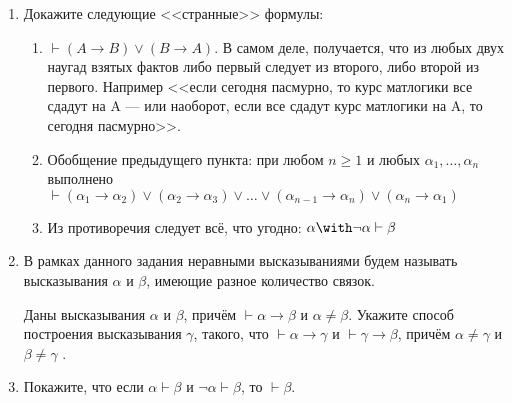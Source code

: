\documentclass[10pt,a4paper,oneside]{article}
\begin{document}
\begin{enumerate}
\item Докажите следующие <<странные>> формулы:
\begin{enumerate}
\item $\vdash (A \rightarrow B) \vee (B \rightarrow A)$. В самом деле, получается, что из любых двух 
наугад взятых фактов либо первый следует из второго, либо второй из первого. Например <<если сегодня
пасмурно, то курс матлогики все сдадут на A --- или наоборот, если все сдадут курс матлогики на A,
то сегодня пасмурно>>.
\item Обобщение предыдущего пункта: при любом $n\ge 1$ и любых $\alpha_1, \dots, \alpha_n$ выполнено 
$\vdash (\alpha_1 \rightarrow \alpha_2) \vee (\alpha_2 \rightarrow \alpha_3) \vee \dots \vee (\alpha_{n-1}\rightarrow\alpha_n)
\vee (\alpha_n\rightarrow\alpha_1)$
\item Из противоречия следует всё, что угодно: $\alpha\with\neg\alpha \vdash \beta$
\end{enumerate}

\item В рамках данного задания неравными высказываниями будем называть высказывания
$\alpha$ и $\beta$, имеющие разное количество связок.

Даны высказывания $\alpha$ и $\beta$, причём $\vdash \alpha\rightarrow\beta$ и $\alpha\ne\beta$. 
Укажите способ построения высказывания $\gamma$, такого, что
$\vdash\alpha\rightarrow\gamma$ и $\vdash\gamma\rightarrow\beta$, причём $\alpha\ne\gamma$ и
$\beta\ne\gamma$ .

\item Покажите, что если $\alpha \vdash \beta$ и $\neg\alpha\vdash\beta$, то $\vdash\beta$.
\end{enumerate}
\end{document}
